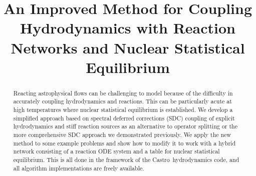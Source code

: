 \documentclass[times,modern]{aastex63}
\newcommand{\castro}{{\sf Castro}}
\begin{document}
\title{An Improved Method for Coupling Hydrodynamics with Reaction Networks and Nuclear Statistical Equilibrium}



\shortauthors{}








\begin{abstract}
Reacting astrophysical flows can be challenging to model because of
the difficulty in accurately coupling hydrodynamics and reactions.
This can be particularly acute at high temperatures where nuclear
statistical equilibrium is established.  We develop a simplified
approach based on spectral deferred corrections (SDC) coupling of explicit
hydrodynamics and stiff reaction sources as an alternative to operator
splitting or the more comprehensive SDC approach we demonstrated
previously.  We apply the new method to some example problems and show
how to modify it to work with a hybrid network consisting of a
reaction ODE system and a table for nuclear statistical equilibrium.
This is all done in the framework of the \castro\ hydrodynamics code,
and all algorithm implementations are freely available.
\end{abstract}
\end{document}
